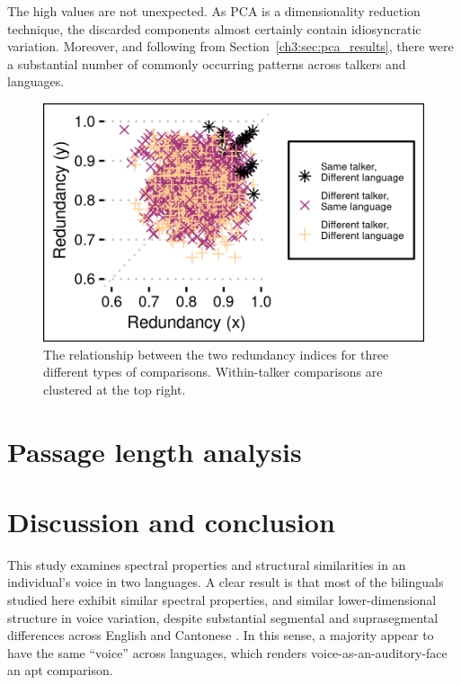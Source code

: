 The high values are not unexpected. As PCA is a dimensionality reduction technique, the discarded components almost certainly contain idiosyncratic variation. Moreover, and following from Section~\ref{ch3:sec:pca_results}, there were a substantial number of commonly occurring patterns across talkers and languages. 

\begin{figure}[htbp]
\begin{center}
\includegraphics[width=0.875\linewidth]{figures/3-reds_pretty.png} 
\caption{The relationship between the two redundancy indices for three different types of comparisons. Within-talker comparisons are clustered at the top right.}
\label{ch3:fig:redundancy}
\end{center}
\end{figure}


\section{Passage length analysis}\label{ch3:sec:passagelength}



\section{Discussion and conclusion}\label{ch3:sec:discussion}

This study examines spectral properties and structural similarities in an individual's voice in two languages. A clear result is that most of the bilinguals studied here exhibit similar spectral properties, and similar lower-dimensional structure in voice variation, despite substantial segmental and suprasegmental differences across English and Cantonese \citep{matthews_2013_cantonese}. In this sense, a majority appear to have the same ``voice'' across languages, which renders voice-as-an-auditory-face an apt comparison.

